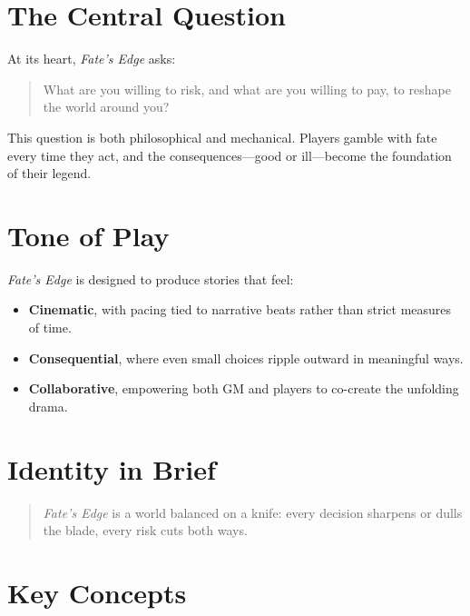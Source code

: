 \documentclass[12pt]{book}
\begin{document}
\section{The Central Question}
At its heart, \textit{Fate’s Edge} asks:  

\begin{quote}
\centering
What are you willing to risk, and what are you willing to pay, to reshape the world around you?
\end{quote}

This question is both philosophical and mechanical. Players gamble with fate every time they act, and the consequences—good or ill—become the foundation of their legend.  

\section{Tone of Play}
\textit{Fate’s Edge} is designed to produce stories that feel:  
\begin{itemize}
  \item \textbf{Cinematic}, with pacing tied to narrative beats rather than strict measures of time.  
  \item \textbf{Consequential}, where even small choices ripple outward in meaningful ways.  
  \item \textbf{Collaborative}, empowering both GM and players to co-create the unfolding drama.  
\end{itemize}

\section{Identity in Brief}
\begin{quote}
\textit{Fate’s Edge} is a world balanced on a knife:  
every decision sharpens or dulls the blade,  
every risk cuts both ways.  
\end{quote}

\section{Key Concepts}
\end{document}
